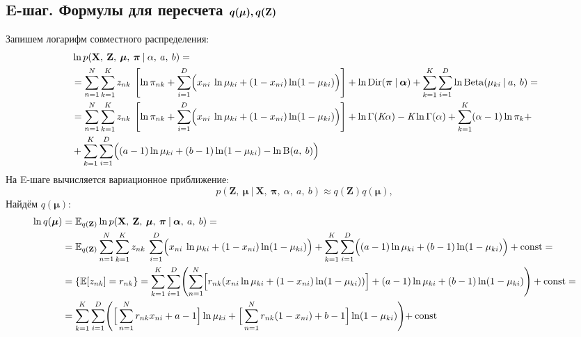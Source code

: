 \documentclass[twoside]{article}
\begin{document}
\subsection{E-шаг. Формулы для пересчета $q(\boldmath{\mu}), q(\textbf{Z})$}
Запишем логарифм совместного распределения: 
	\begin{align*}\label{eq:5}
	&\ln p(\textbf{X},\: \textbf{Z},\: \boldsymbol{\mu},\: \boldsymbol{\pi}\: |\: {\alpha},\: a,\: b) = \\
	&= \sum_{n = 1}^N \sum_{k = 1}^K z_{nk}\: \left[ \ln \pi_{nk} +  \sum_{i = 1}^D \Bigl( x_{ni}\: \ln\mu_{ki} + (1 - x_{ni})\ln(1-\mu_{ki})\Bigr)\right] + 
	\ln \mathrm{Dir}(\boldsymbol{\pi} \:|\: \boldsymbol{\alpha}) + 
	\sum_{k = 1}^K \sum_{i = 1}^D \ln\mathrm{Beta}(\mu_{ki} \:|\: a,\: b) =\\
	&= \sum_{n = 1}^N \sum_{k = 1}^K z_{nk}\:\left[\ln \pi_{nk} +  \sum_{i = 1}^D \Bigl( x_{ni}\: \ln\mu_{ki} + (1 - x_{ni})\ln(1-\mu_{ki})\Bigr)\right]
	+ \ln \Gamma(\textit{K}\alpha) - \textit{K}\ln\Gamma(\alpha) +   
	\sum_{k = 1}^K (\alpha - 1)\ln \pi_k + \\ 
	&+ \sum_{k = 1}^K \sum_{i = 1}^D \Bigl( (a - 1)\ln\mu_{ki} + (b - 1)\ln(1 - \mu_{ki})- \ln\mathrm{B}(a,\: b)\Bigr)
	\end{align*}
	На E-шаге вычисляется вариационное
	приближение:
	\[p({\textbf{Z}},\: \boldsymbol{\mu} \:|\: {\textbf{X}},\: \boldsymbol{\pi},\: \alpha,\: a,\: b) \approx q({\textbf{Z}})q(\boldsymbol{\mu}),\]
	Найдём $q(\boldsymbol\mu)$:
	\begin{align*}
	\ln q(\boldsymbol\mu) &= \mathbb{E}_{q(\textbf{Z})} \ln p(\textbf{X},\: \textbf{Z},\: \boldsymbol\mu,\: \boldsymbol\pi \:|\: \boldsymbol\alpha,\: a,\: b) = \\
	&= \mathbb{E}_{q(\textbf{Z})}\sum_{n = 1}^N \sum_{k = 1}^K z_{nk}\: \sum_{i = 1}^D \Bigl( x_{ni}\: \ln\mu_{ki} + (1 - x_{ni})\ln(1-\mu_{ki})\Bigr)  
	+ \sum_{k = 1}^K \sum_{i = 1}^D \Bigl( (a - 1) \ln \mu_{ki} + (b - 1) \ln(1 - \mu_{ki}) \Bigr) + \mathrm{const} = \\
	&=\{\mathbb{E}[z_{nk}] = r_{nk}\} =\sum_{k = 1}^K \sum_{i = 1}^D \Biggl( 
	\sum_{n = 1}^N \Bigl[r_{nk} (x_{ni} \ln \mu_{ki} + 
	(1 - x_{ni}) \ln (1 - \mu_{ki}))\Bigr] 
	+ (a - 1) \ln \mu_{ki} + (b - 1) \ln (1 - \mu_{ki}) \Biggr) + \mathrm{const} = \\
	&= \sum_{k = 1}^K \sum_{i = 1}^D \Biggl( 
	\Big[ \sum_{n = 1}^N r_{nk} x_{ni} + a - 1 \Big] \ln \mu_{ki} + 
	\Big[ \sum_{n = 1}^N r_{nk} (1 - x_{ni}) + b - 1 \Big] \ln (1 - \mu_{ki}) \Biggl) + \:\mathrm{const}
	\end{align*}
	
\end{document}
